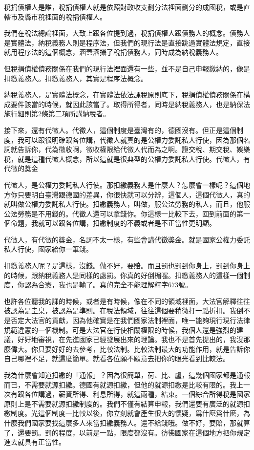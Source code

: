 \documentclass[oneside,sub3section]{ctexbook}
\begin{document}
稅捐債權人是誰，稅捐債權人就是依照財政收支劃分法裡面劃分的成國稅，或是直轄市及縣市稅裡面的稅捐債權人。

我們在稅法總論裡面，大致上跟各位提到過，稅捐債權人跟債務人的概念。債務人是實體法，納稅義務人則是程序法，但我們的現行法是直接跳過實體法規定，直接就用程序法的這個概念，涵蓋涵攝了稅捐債務人，同時成為納稅義務人。

但稅捐債權債務關係在我們的現行法裡面還有一些，並不是自己申報繳納的，像是扣繳義務人。扣繳義務人，其實是程序法概念。

納稅義務人，是實體法概念，在實體法依法課稅原則底下，稅捐債權債務關係在構成要件該當的時候，就因此該當了。取得所得者，同時是納稅義務人，也是納保法施行細則第2條第二項所講納稅者。

接下來，還有代徵人。代徵人，這個制度是臺灣有的，德國沒有。但正是這個制度，我可以跟很明確跟各位講，代徵人就真的是公權力委託私人行使，因為那個名詞就告訴你，代為徵收啊，徵收權限給代徵人代而為之啊。證交稅、期交稅、娛樂稅，就是這種代徵人概念，所以這就是很典型的公權力委託私人行使。代徵人，有代徵的獎金

代徵人，是公權力委託私人行使。那扣繳義務人是什麼人？怎麼會一樣呢？這個地方你只要明白臺灣跟德國的差異，你很快就可以分辨，這個人，這個代徵人，真的就叫做公權力委託私人行使。扣繳義務人，叫做，服公法勞務的私人，而且，他服公法勞務是不用錢的。代徵人還可以拿錢你。你這樣一比較下去，回到前面的第一個命題，我就可以跟各位講，扣繳制度的不義或者是不正當性更明顯。

代徵人，有代徵的獎金，名詞不太一樣，有些會講代徵獎金。就是國家公權力委託私人行使，國家給你一筆錢。

扣繳義務人呢？是這樣，沒錢。做不好，要賠。而且罰也罰到你身上，罰到你身上的時候，跟納稅義務人是同樣的處罰。你真的好倒楣喔。扣繳義務人的這樣一個制度，你認為合憲，我也是輸了。真的完全不能理解釋字673號。

也許各位聽我的課的時候，或者是有時候，像在不同的領域裡面，大法官解釋往往被認為是圭臬，被認為是準則。在稅法領域，往往這個要稍微打一點折扣。我倒不是否定大法官的貢獻，因為他確實是在我們國家法制裡面，唯一能夠現行現行法律規範違憲的一個機制。可是大法官在行使相關權限的時候，我個人還是強烈的建議，好好地審視，在先進國家已經發展出來的理論。我也不是首先提出的，我沒那麼偉大。你只要好好的去參考，比較法制。比較法制最大的功能作用，就是告訴你自己哪裡不足，就這麼簡單。就看各位願不願意去把你的眼光看到比較法。

我為什麼會知道扣繳的「通報」？因為很簡單，荷、比、盧，這幾個國家都是通報而已，不需要就源扣繳。德國有就源扣繳，但他的就源扣繳是比較有限的。我上一次有跟各位講過，薪資所得、利息所得，就這兩種，結束。一個綜合所得稅是國家原則上是不需要就源扣繳制度的。我們不僅有結算申報，我們還要有廣泛的就源扣繳制度。光這個制度一比較以後，你立刻就會產生很大的懷疑，爲什麽爲什麽，為什麼我們國家要找這麼多人來當扣繳義務人。還不給錢哦。做不好，要賠，那就算了，還要罰。罰的程度，以前是一點，限度都沒有。彷彿國家在這個地方把你規定進去就具有正當性。
\end{document}
